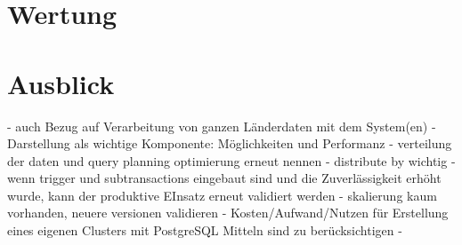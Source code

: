 \section{Wertung}

\section{Ausblick}

- auch Bezug auf Verarbeitung von ganzen Länderdaten mit dem System(en)
- Darstellung als wichtige Komponente: Möglichkeiten und Performanz
- verteilung der daten und query planning optimierung erneut nennen
- distribute by wichtig
- wenn trigger und subtransactions eingebaut sind und die Zuverlässigkeit erhöht wurde, kann der produktive EInsatz erneut validiert werden
- skalierung kaum vorhanden, neuere versionen validieren
- Kosten/Aufwand/Nutzen für Erstellung eines eigenen Clusters mit PostgreSQL Mitteln sind zu berücksichtigen
- 



\label{LastPage}